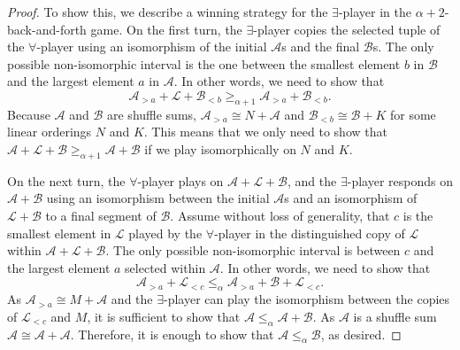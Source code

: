\documentclass[10pt,a4paper]{amsart}
\providecommand{\A}{\mathcal{A}}
\providecommand{\L}{\mathcal{L}}
\providecommand{\B}{\mathcal{B}}
\renewcommand{\L}{\mathcal{L}}
\begin{document}
\begin{proof}
To show this, we describe a winning strategy for the $\exists$-player in the
$\alpha+2$-back-and-forth game. 
On the first turn, the $\exists$-player copies the selected tuple of the
$\forall$-player using an isomorphism of the initial $\A$s and the final $\B$s. 
The only possible non-isomorphic interval is the one between the smallest
element $b$ in $\B$ and the largest element $a$ in $\A$. 
In other words, we need to show that 
\[\A_{>a}+\L+\B_{<b}\geq_{\alpha+1} \A_{>a}+\B_{<b}.\]
Because $\A$ and $\B$ are shuffle sums, $\A_{>a}\cong N+\A$ and $\B_{<b}\cong
\B+K$ for some linear orderings $N$ and $K$. 
This means that we only need to show that
$\A+\L+\B\geq_{\alpha+1}\A+\B$
if we play isomorphically on $N$ and $K$.

On the next turn, the $\forall$-player plays on $\A+\L+\B$, and the
$\exists$-player responds on $\A+\B$ using an isomorphism between the initial
$\A$s and an isomorphism of $\L+\B$ to a final segment of $\B$.
Assume without loss of generality, that $c$ is the smallest element in $\L$
played by the $\forall$-player in the distinguished copy of $\L$ within $\A+\L+\B$.
The only possible non-isomorphic interval is between $c$ and the
largest element $a$ selected within $\A$.
In other words, we need to show that 
\[\A_{>a}+\L_{<c}\leq_{\alpha} \A_{>a}+\B+\L_{<c}.\]
As $\A_{>a}\cong M+\A$ and the $\exists$-player can play the isomorphism between
the copies of $\L_{<c}$ and $M$, it is sufficient to show that $\A\leq_{\alpha}\A+\B$.
As $\A$ is a shuffle sum $\A\cong \A+\A$.
Therefore, it is enough to show that $\A\leq_\alpha \B$, as desired.
\end{proof}
\end{document}
